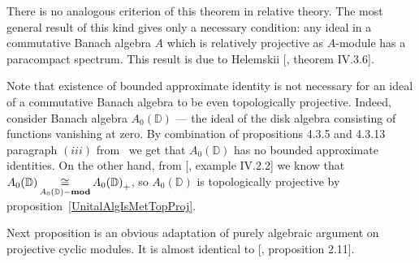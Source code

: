 There is no analogous criterion of this theorem in relative theory. The most
general result of this kind gives only a necessary condition: any ideal in a
commutative Banach algebra $A$ which is relatively projective as $A$-module has
a paracompact spectrum. This result is due to Helemskii
[\cite{HelHomolBanTopAlg}, theorem IV.3.6]. 

Note that existence of bounded approximate identity is not necessary for an
ideal of a commutative Banach algebra to be even topologically projective.
Indeed, consider Banach algebra  $A_0(\mathbb{D})$ --- the ideal of the disk
algebra consisting of functions vanishing at zero. By combination of 
propositions 4.3.5 and 4.3.13 paragraph $(iii)$ from~\cite{DalBanAlgAutCont} 
we get that $A_0(\mathbb{D})$ has no bounded approximate identities. 
On the other hand, from [\cite{HelBanLocConvAlg}, example IV.2.2] we know that
$A_0(\mathbb{D})\mathop{\mathbin{\cong}}\limits_{A_0(\mathbb{D})-\mathbf{mod}} {A_0(\mathbb{D})}_+$, so
$A_0(\mathbb{D})$ is topologically projective by
proposition~\ref{UnitalAlgIsMetTopProj}.

Next proposition is an obvious adaptation of purely algebraic argument on
projective cyclic modules. It is almost identical to [\cite{WhiteInjmoduAlg},
proposition 2.11].

